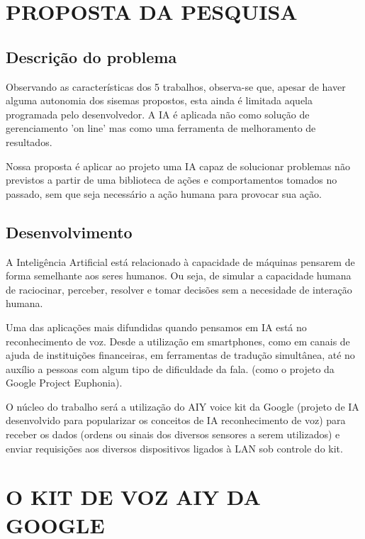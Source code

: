 \documentclass[10pt,brazil,english]{article}
\begin{document}
\section{\uppercase {Proposta da pesquisa}}
\subsection{Descrição do problema}

Observando as características dos 5 trabalhos, observa-se que, apesar de haver alguma autonomia dos sisemas propostos, esta ainda é limitada aquela programada pelo desenvolvedor. A IA é aplicada não como solução de gerenciamento 'on line' mas como uma ferramenta de melhoramento de resultados. 

Nossa proposta é aplicar ao projeto uma IA capaz de solucionar problemas não previstos a partir de uma biblioteca de ações e comportamentos tomados no passado, sem que seja necessário a ação humana para provocar sua ação.

\subsection{Desenvolvimento}

A Inteligência Artificial está relacionado à capacidade de máquinas pensarem de forma semelhante aos seres humanos. Ou seja, de simular a capacidade humana de raciocinar, perceber, resolver e tomar decisões sem a necesidade de interação humana. 

Uma das aplicações mais difundidas quando pensamos em IA está no reconhecimento de voz. Desde a utilização em smartphones, como em canais de ajuda de instituições financeiras, em ferramentas de tradução simultânea, até no auxílio a pessoas com algum tipo de dificuldade da fala. (como o projeto da Google Project Euphonia).

O núcleo do trabalho será a utilização do AIY voice kit da Google (projeto de IA desenvolvido para popularizar os conceitos de IA reconhecimento de voz) para receber os dados (ordens ou sinais dos diversos sensores a serem utilizados) e enviar requisições aos diversos dispositivos ligados à LAN sob controle do kit.

\section{\uppercase{O kit de voz AIY da Google}}
\end{document}
